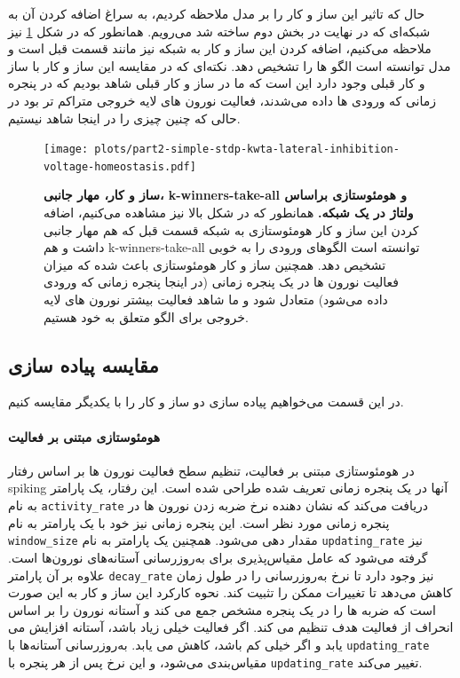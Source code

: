         حال که تاثیر این ساز و کار را بر مدل ملاحظه کردیم، به سراغ اضافه کردن آن به شبکه‌ای که در نهایت در بخش دوم ساخته شد می‌رویم. همانطور که در شکل 
        \ref{fig:part2-simple-stdp-kwta-lateral-inhibition-voltage-homeostasis} 
        نیز ملاحظه می‌کنیم، اضافه کردن این ساز و کار به شبکه نیز مانند قسمت قبل است و مدل توانسته است الگو ها را تشخیص دهد. نکته‌ای که در مقایسه این ساز و کار با ساز و کار قبلی وجود دارد این است که ما در ساز و کار قبلی شاهد بودیم که در پنجره زمانی که ورودی ها داده می‌شدند، فعالیت نورون های لایه خروجی متراکم تر بود در حالی که چنین چیزی را در اینجا شاهد نیستیم.

        \begin{figure}[!ht]
            \centering
            \texttt{[image: plots/part2-simple-stdp-kwta-lateral-inhibition-voltage-homeostasis.pdf]} 
            \captionsetup{width=.9\linewidth}
            \caption{\textbf{ ساز و کار، مهار جانبی، 
            k-winners-take-all و 
            هومئوستازی براساس ولتاژ در یک شبکه.} همانطور که در شکل بالا نیز مشاهده می‌کنیم، اضافه کردن این ساز و کار هومئوستازی به شبکه قسمت قبل که هم مهار جانبی داشت و هم 
            k-winners-take-all 
            توانسته است الگوهای ورودی را به خوبی تشخیص دهد. همچنین ساز و کار هومئوستازی باعث شده که میزان فعالیت نورون ها در یک پنجره زمانی
            (در اینجا پنجره زمانی که ورودی داده می‌شود) 
            متعادل شود و ما شاهد فعالیت بیشتر نورون های لایه خروجی برای الگو متعلق به خود هستیم.}
            \label{fig:part2-simple-stdp-kwta-lateral-inhibition-voltage-homeostasis}
        \end{figure}

        \subsection*{مقایسه پیاده سازی}
            در این قسمت می‌خواهیم پیاده سازی دو ساز و کار را با یکدیگر مقایسه کنیم.
            \paragraph*{هومئوستازی مبتنی بر فعالیت} در هومئوستازی مبتنی بر فعالیت، تنظیم سطح فعالیت نورون ها بر اساس رفتار spiking آنها در یک پنجره زمانی تعریف شده طراحی شده است. این رفتار، یک پارامتر به نام 
            \texttt{activity\_rate} 
            دریافت می‌کند که نشان دهنده نرخ ضربه زدن نورون ها در پنجره زمانی مورد نظر است. این پنجره زمانی نیز خود با یک پارامتر به نام 
            \texttt{window\_size} مقدار دهی می‌شود. 
            همچنین یک پارامتر به نام 
            \texttt{updating\_rate} 
            نیز گرفته می‌شود که عامل مقیاس‌پذیری برای به‌روزرسانی آستانه‌های نورون‌ها است. علاوه بر آن پارامتر 
            \texttt{decay\_rate} 
            نیز وجود دارد تا نرخ به‌روزرسانی را در طول زمان کاهش می‌دهد تا تغییرات ممکن را تثبیت کند.
            نحوه کارکرد این ساز و کار به این صورت است که ضربه ها را در یک پنجره مشخص جمع می کند و آستانه نورون را بر اساس انحراف از فعالیت هدف تنظیم می کند. اگر فعالیت خیلی زیاد باشد، آستانه افزایش می یابد و اگر خیلی کم باشد، کاهش می یابد. به‌روزرسانی آستانه‌ها با 
            \texttt{updating\_rate} 
            مقیاس‌بندی می‌شود، و این نرخ پس از هر پنجره با 
            \texttt{updating\_rate} 
             تغییر می‌کند.
            
